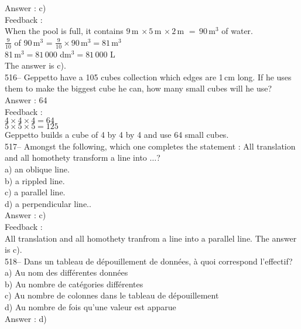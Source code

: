 ﻿\documentclass[letterpaper, 12pt]{article}
\begin{document}
Answer : c)\\

Feedback :\\
When the pool is full, it contains  $9$\,m
$\times\,5$\,m $\times\,2$\,m $=\,90$\,m$^{3}$ of water.\\[2mm]
$\frac{9}{10}$ of 90\,m$^{3}$ =
$\frac{9}{10}\times90$\,m$^{3}=81$\,m$^{3}$\\[2mm]
81\,m$^{3}=81\,000$ dm$^{3}=81\,000$ L\\[2mm]
The answer is c).\\

516-- Geppetto have a 105 cubes collection which edges are 1\,cm long. If he uses them to make the biggest cube he can, how many small cubes will he use? \\

Answer : 64\\

Feedback :  \\
$4\times4\times4=64$\\
$5\times5\times5=125$\\
Geppetto builds a cube of 4 by 4 by 4 and use 64 small cubes.  \\

517-- Amongst the following, which one completes the statement : \og All translation and all homothety transform a line into $\ldots$\fg ?\\
a) an oblique line.\\
b) a rippled line.\\
c) a parallel line.\\
d) a perpendicular line..\\

Answer : c)\\

Feedback : \\
All translation and all homothety tranfrom a line into a parallel line.  The answer is c).\\


518-- Dans un tableau de d\'epouillement de donn\'ees, \`a quoi correspond
l'effectif?\\
a) Au nom des diff\'erentes donn\'ees\\
b) Au nombre de cat\'egories diff\'erentes\\
c) Au nombre de colonnes dans le tableau de d\'epouillement\\
d) Au nombre de fois qu'une valeur est apparue\\

Answer : d)\\
\end{document}
